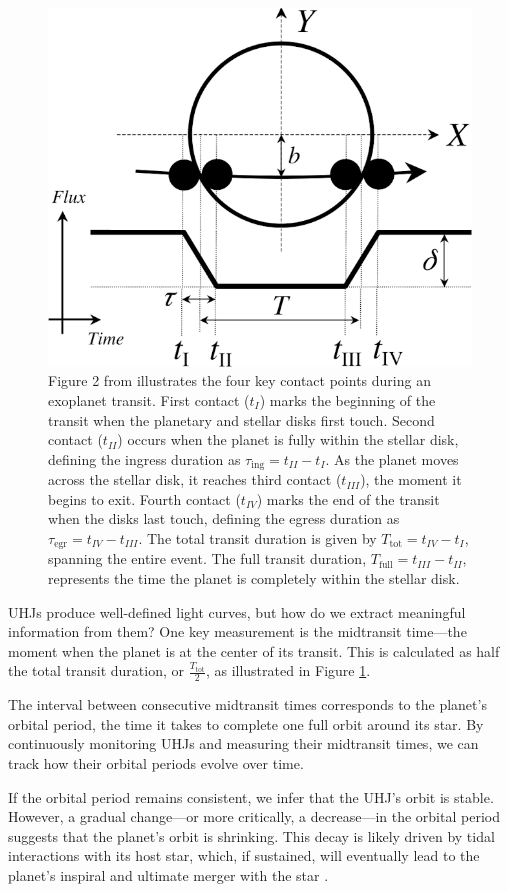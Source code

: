 \documentclass[oneside,12pt]{amsart}
\numberwithin{page}{section}
\begin{document}
\begin{figure}[htbp]
    \centering
    \includegraphics[width=0.6\linewidth]{figs/winn_fig2.png}
    \caption{Figure 2 from \citet{winn2010transits} illustrates the four key contact points during an exoplanet transit. First contact ($t_I$) marks the beginning of the transit when the planetary and stellar disks first touch. Second contact ($t_{II}$) occurs when the planet is fully within the stellar disk, defining the ingress duration as $\tau_\text{ing} = t_{II} - t_I$. As the planet moves across the stellar disk, it reaches third contact ($t_{III}$), the moment it begins to exit. Fourth contact ($t_{IV}$) marks the end of the transit when the disks last touch, defining the egress duration as $\tau_\text{egr} = t_{IV} - t_{III}$. The total transit duration is given by $T_\text{tot} = t_{IV} - t_{I}$, spanning the entire event. The full transit duration, $T_\text{full} = t_{III} - t_{II}$, represents the time the planet is completely within the stellar disk.}
    \label{fig:winnfig2}
\end{figure}

UHJs produce well-defined light curves, but how do we extract meaningful information from them? One key measurement is the midtransit time—the moment when the planet is at the center of its transit. This is calculated as half the total transit duration, or 
$\frac{T_{\text{tot}}}{2}$, as illustrated in Figure \ref{fig:winnfig2}.

The interval between consecutive midtransit times corresponds to the planet’s orbital period, the time it takes to complete one full orbit around its star. By continuously monitoring UHJs and measuring their midtransit times, we can track how their orbital periods evolve over time.

If the orbital period remains consistent, we infer that the UHJ's orbit is stable. However, a gradual change—or more critically, a decrease—in the orbital period suggests that the planet’s orbit is shrinking. This decay is likely driven by tidal interactions with its host star, which, if sustained, will eventually lead to the planet’s inspiral and ultimate merger with the star \citep{ogilvie2014tidal}.
\end{document}
